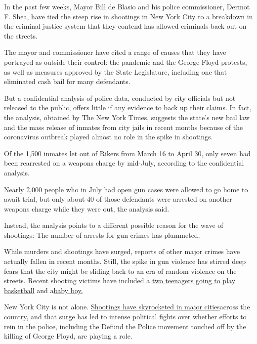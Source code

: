 In the past few weeks, Mayor Bill de Blasio and his police commissioner,
Dermot F. Shea, have tied the steep rise in shootings in New York City
to a breakdown in the criminal justice system that they contend has
allowed criminals back out on the streets.

The mayor and commissioner have cited a range of causes that they have
portrayed as outside their control: the pandemic and the George Floyd
protests, as well as measures approved by the State Legislature,
including one that eliminated cash bail for many defendants.

But a confidential analysis of police data, conducted by city officials
but not released to the public, offers little if any evidence to back up
their claims. In fact, the analysis, obtained by The New York Times,
suggests the state's new bail law and the mass release of inmates from
city jails in recent months because of the coronavirus outbreak played
almost no role in the spike in shootings.

Of the 1,500 inmates let out of Rikers from March 16 to April 30, only
seven had been rearrested on a weapons charge by mid-July, according to
the confidential analysis.

Nearly 2,000 people who in July had open gun cases were allowed to go
home to await trial, but only about 40 of those defendants were arrested
on another weapons charge while they were out, the analysis said.

Instead, the analysis points to a different possible reason for the wave
of shootings: The number of arrests for gun crimes has plummeted.

While murders and shootings have surged, reports of other major crimes
have actually fallen in recent months. Still, the spike in gun violence
has stirred deep fears that the city might be sliding back to an era of
random violence on the streets. Recent shooting victims have included a
\href{https://www.nytimes3xbfgragh.onion/2020/07/27/nyregion/nyc-shootings-weekend.html?searchResultPosition=1}{two
teenagers going to play basketball} and
a\href{https://www.nytimes3xbfgragh.onion/2020/07/13/nyregion/Davell-Gardner-brooklyn-shooting.html?searchResultPosition=9}{baby
boy.}

New York City is not alone.
\href{https://www.nytimes3xbfgragh.onion/2020/07/05/us/chicago-shootings.html?searchResultPosition=6}{Shootings
have skyrocketed in major cities}across the country, and that surge has
led to intense political fights over whether efforts to rein in the
police, including the Defund the Police movement touched off by the
killing of George Floyd, are playing a role.


